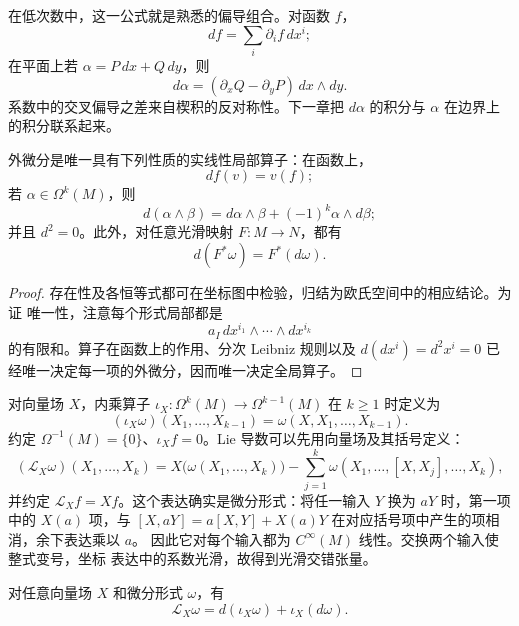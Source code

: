 在低次数中，这一公式就是熟悉的偏导组合。对函数 \(f\)，
\[
 df=\sum_i\partial_i f\,dx^i;
\]
在平面上若 \(\alpha=P\,dx+Q\,dy\)，则
\[
 d\alpha=(\partial_xQ-\partial_yP)\,dx\wedge dy.
\]
系数中的交叉偏导之差来自楔积的反对称性。下一章把 \(d\alpha\) 的积分与
\(\alpha\) 在边界上的积分联系起来。

\begin{theorem}[流形上的外微分]
\label{thm:manifold-exterior-derivative}
外微分是唯一具有下列性质的实线性局部算子：在函数上，
\[
 df(v)=v(f);
\]
若 \(\alpha\in\Omega^k(M)\)，则
\[
 d(\alpha\wedge\beta)
 =d\alpha\wedge\beta+(-1)^k\alpha\wedge d\beta;
\]
并且 \(d^2=0\)。此外，对任意光滑映射 \(F:M\to N\)，都有
\[
 d(F^*\omega)=F^*(d\omega).
\]
\end{theorem}

\begin{proof}
存在性及各恒等式都可在坐标图中检验，归结为欧氏空间中的相应结论。为证
唯一性，注意每个形式局部都是
\[
 a_I\,dx^{i_1}\wedge\cdots\wedge dx^{i_k}
\]
的有限和。算子在函数上的作用、分次 Leibniz 规则以及
\(d(dx^i)=d^2x^i=0\) 已经唯一决定每一项的外微分，因而唯一决定全局算子。
\end{proof}

对向量场 \(X\)，内乘算子
\(\iota_X:\Omega^k(M)\to\Omega^{k-1}(M)\) 在 $k\ge1$ 时定义为
\[
 (\iota_X\omega)(X_1,\ldots,X_{k-1})
 =\omega(X,X_1,\ldots,X_{k-1}).
\]
约定 $\Omega^{-1}(M)=\{0\}$、$\iota_Xf=0$。Lie 导数可以先用向量场及其括号定义：
\[
 (\mathcal L_X\omega)(X_1,\ldots,X_k)
 =X\bigl(\omega(X_1,\ldots,X_k)\bigr)
 -\sum_{j=1}^k
 \omega(X_1,\ldots,[X,X_j],\ldots,X_k),
\]
并约定 \(\mathcal L_Xf=Xf\)。这个表达确实是微分形式：将任一输入 $Y$
换为 $aY$ 时，第一项中的 $X(a)$ 项，与
$[X,aY]=a[X,Y]+X(a)Y$ 在对应括号项中产生的项相消，余下表达乘以 $a$。
因此它对每个输入都为 $C^\infty(M)$ 线性。交换两个输入使整式变号，坐标
表达中的系数光滑，故得到光滑交错张量。

\begin{theorem}[Cartan 公式]
\label{thm:cartan-magic-formula}
对任意向量场 \(X\) 和微分形式 \(\omega\)，有
\[
 \mathcal L_X\omega=d(\iota_X\omega)+\iota_X(d\omega).
\]
\end{theorem}

